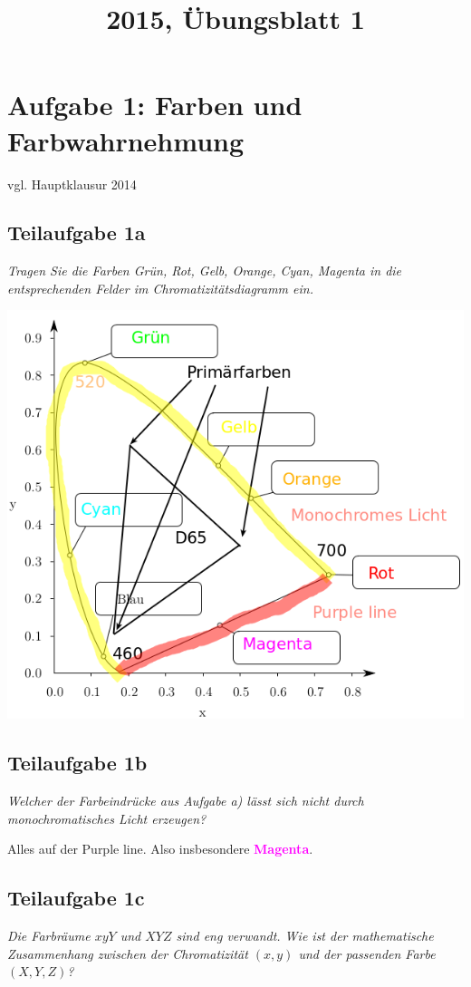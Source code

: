 \documentclass[a4paper]{scrartcl}
\begin{document}
\title{2015, Übungsblatt 1}

\setcounter{section}{1}
\section*{Aufgabe 1: Farben und Farbwahrnehmung}
vgl. Hauptklausur 2014
\subsection*{Teilaufgabe 1a}
\textit{Tragen Sie die Farben Grün, Rot, Gelb, Orange, Cyan, Magenta in die
        entsprechenden Felder im Chromatizitätsdiagramm ein.}

\includegraphics*[width=0.8\linewidth, keepaspectratio]{1a.png}

\subsection*{Teilaufgabe 1b}
\textit{Welcher der Farbeindrücke aus Aufgabe a) lässt sich nicht durch monochromatisches Licht
erzeugen?}

Alles auf der Purple line. Also insbesondere \textcolor{magenta}{\textbf{Magenta}}.

\subsection*{Teilaufgabe 1c}
\textit{Die Farbräume $xyY$ und $XYZ$ sind eng verwandt. Wie ist der
mathematische Zusammenhang zwischen der Chromatizität $(x, y)$ und der
passenden Farbe $(X, Y, Z)$?}
\end{document}
